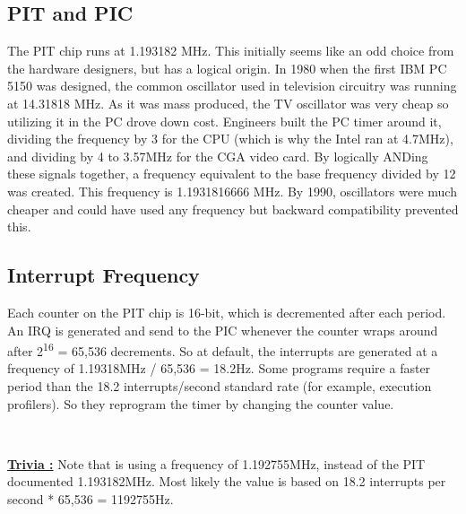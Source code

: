 \documentclass[book.tex]{subfiles}
\begin{document}
\subsection{PIT and PIC}
The PIT chip runs at 1.193182 MHz. This initially seems like an odd choice from the hardware designers, but has a logical origin. In 1980 when the first IBM PC 5150 was designed, the common oscillator used in television circuitry was running at 14.31818 MHz. As it was mass produced, the TV oscillator was very cheap so utilizing it in the PC drove down cost. Engineers built the PC timer around it, dividing the frequency by 3 for the CPU (which is why the Intel ran at 4.7MHz), and dividing by 4 to 3.57MHz for the CGA video card. By logically ANDing these signals together, a frequency equivalent to the base frequency divided by 12 was created. This frequency is 1.1931816666 MHz. By 1990, oscillators were much cheaper and could have used any frequency but backward compatibility prevented this.\\

\subsection{Interrupt Frequency}
Each counter on the PIT chip is 16-bit, which is decremented after each period. An IRQ is generated and send to the PIC whenever the counter wraps around after 2\textsuperscript{16} = 65,536 decrements. So at default, the interrupts are generated at a frequency of 1.19318MHz / 65,536 = 18.2Hz. Some programs require a faster period than the 18.2 interrupts/second standard rate (for example, execution profilers). So they reprogram the timer by changing the counter value.\\
\par
\begin{minipage}{\textwidth}

\end{minipage}\\
\par

\textbf{\underline{Trivia :}} Note that  is using a frequency of 1.192755MHz, instead of the PIT documented 1.193182MHz. Most likely the value is based on 18.2 interrupts per second * 65,536 = 1192755Hz.\\
\end{document}

